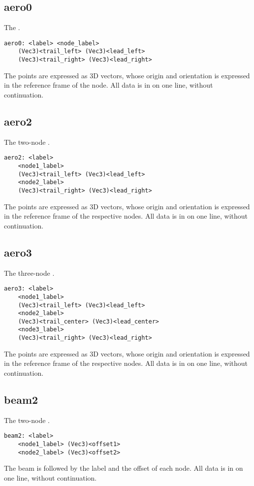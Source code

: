 \subsection{aero0}
The .
\begin{verbatim}
aero0: <label> <node_label>
    (Vec3)<trail_left> (Vec3)<lead_left>
    (Vec3)<trail_right> (Vec3)<lead_right>
\end{verbatim}
The points are expressed as 3D vectors, whose origin and orientation
is expressed in the reference frame of the node.
All data is in on one line, without continuation.

\subsection{aero2}
The two-node .
\begin{verbatim}
aero2: <label>
    <node1_label>
    (Vec3)<trail_left> (Vec3)<lead_left>
    <node2_label>
    (Vec3)<trail_right> (Vec3)<lead_right>
\end{verbatim}
The points are expressed as 3D vectors, whose origin and orientation
is expressed in the reference frame of the respective nodes.
All data is in on one line, without continuation.

\subsection{aero3}
The three-node .
\begin{verbatim}
aero3: <label>
    <node1_label>
    (Vec3)<trail_left> (Vec3)<lead_left>
    <node2_label>
    (Vec3)<trail_center> (Vec3)<lead_center>
    <node3_label>
    (Vec3)<trail_right> (Vec3)<lead_right>
\end{verbatim}
The points are expressed as 3D vectors, whose origin and orientation
is expressed in the reference frame of the respective nodes.
All data is in on one line, without continuation.

\subsection{beam2}
The two-node .
\begin{verbatim}
beam2: <label>
    <node1_label> (Vec3)<offset1>
    <node2_label> (Vec3)<offset2>
\end{verbatim}
The beam  is followed by the label and the offset of each node.
All data is in on one line, without continuation.


